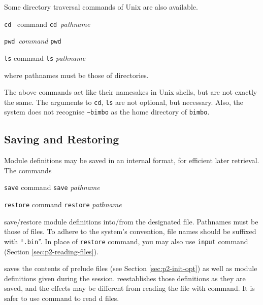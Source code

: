 \documentclass[a4paper]{memoir}
\begin{document}
Some directory traversal commands of Unix are also available.

\begin{bsyntax} \texttt{cd}~ command \Hline
\texttt{cd}~\textit{pathname}
\end{bsyntax}

\begin{bsyntax} \texttt{pwd}~\textit{command}\Hline
\texttt{pwd}
\end{bsyntax}

\begin{bsyntax} \texttt{ls} command \Hline
\texttt{ls} \textit{pathname}
\end{bsyntax}

where pathnames must be those of directories.

\begin{warning}
  The above commands act like their namesakes in Unix shells,
  but are not exactly the same.
  The arguments to \verb|cd|, \verb|ls| are not optional, but necessary.
  Also, the system does not recognise \verb|~bimbo| as the home directory of
  \verb|bimbo|.
\end{warning}

\subsection{Saving and Restoring}\label{sec:p2-save-restore}

Module definitions may be saved in an internal format, for efficient
later retrieval. The commands

\begin{bsyntax} \texttt{save} command \Hline
\texttt{save} \textit{pathname}
\end{bsyntax}

\begin{bsyntax} \texttt{restore} command \Hline
\texttt{restore} \textit{pathname}
\end{bsyntax}

save/restore module definitions into/from the designated file.
Pathnames must be those of files. To adhere to the system's convention,
file names should be suffixed with ``\verb|.bin|''.  In place of
\verb|restore| command, you may also use \verb|input| command
(Section \ref{sec:p2-reading-files}).

\begin{warning}
   saves the contents of prelude files (see Section
 \ref{sec:p2-init-opt})
  as well as module definitions given during the session.
   reestablishes those definitions as they are saved, and
  the effects may be different from reading the file with  command.
  It is safer to use  command to read d files.
\end{warning}
\end{document}
